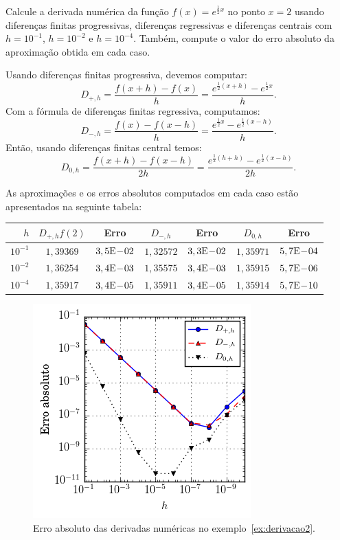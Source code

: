 \begin{ex}\label{ex:derivacao2}
Calcule a derivada numérica da função $f(x)=e^{\frac{1}{2}x}$ no ponto $x=2$ usando diferenças finitas progressivas, diferenças regressivas e diferenças centrais com $h=10^{-1}$, $h=10^{-2}$ e $h=10^{-4}$. Também, compute o valor do erro absoluto da aproximação obtida em cada caso.
\end{ex}
\begin{sol}
  Usando diferenças finitas progressiva, devemos computar:
  \begin{equation*}
    D_{+,h} = \frac{f(x+h) - f(x)}{h} = \frac{e^{\frac{1}{2}(x+h)} - e^{\frac{1}{2}x}}{h}.
  \end{equation*}
  Com a fórmula de diferenças finitas regressiva, computamos:
  \begin{equation*}
    D_{-,h} = \frac{f(x) - f(x-h)}{h} = \frac{e^{\frac{1}{2}x} - e^{\frac{1}{2}(x-h)}}{h}.
  \end{equation*}
  Então, usando diferenças finitas central temos:
  \begin{equation*}
    D_{0,h} = \frac{f(x+h) - f(x-h)}{2h} = \frac{e^{\frac{1}{2}(h+h)} - e^{\frac{1}{2}(x-h)}}{2h}.
  \end{equation*}

  As aproximações e os erros absolutos computados em cada caso estão apresentados na seguinte tabela:
  \begin{center}
    \begin{tabular}{r|cc|cc|cc}
      $h$  & $D_{+,h}f(2)$ & Erro & $D_{-,h}$ & Erro & $D_{0,h}$ & Erro \\\hline
      $10^{-1}$ & $1,39369$ & $3,5\mathrm{E}\!-\!02$   & $1,32572$ & $3,3\mathrm{E}\!-\!02$ & $1,35971$ & $5,7\mathrm{E}\!-\!04$\\
      $10^{-2}$ & $1,36254$ & $3,4\mathrm{E}\!-\!03$   & $1,35575$ & $3,4\mathrm{E}\!-\!03$ & $1,35915$ & $5,7\mathrm{E}\!-\!06$\\
      $10^{-4}$ & $1,35917$ & $3,4\mathrm{E}\!-\!05$   & $1,35911$ & $3,4\mathrm{E}\!-\!05$ & $1,35914$ & $5,7\mathrm{E}\!-\!10$\\\hline
    \end{tabular}
  \end{center}
\end{sol}

\begin{figure}
  \centering
  \includegraphics{./cap_derivacao/pics/ex_derivacao2/ex_derivacao2}
  \caption{Erro absoluto das derivadas numéricas no exemplo~\ref{ex:derivacao2}.}
  \label{fig:ex_derivacao2}
\end{figure}


